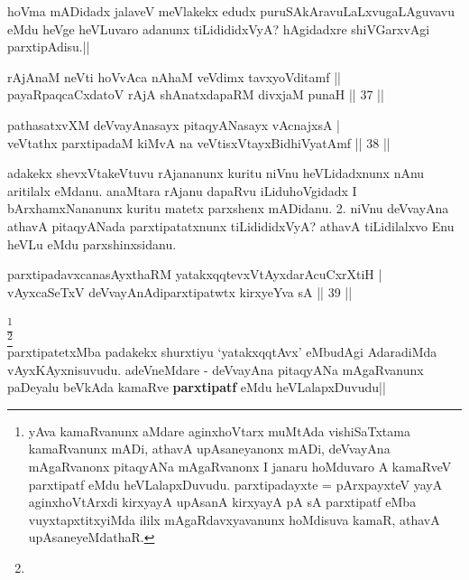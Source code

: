 \begin{artha}
hoVma mADidadx jalaveV meVlakekx edudx puruSAkAravuLaLxvugaLAguvavu 
eMdu heVge heVLuvaro adanunx tiLidididxVyA? hAgidadxre shiVGarxvAgi 
parxtipAdisu.||
\end{artha}

\begin{shl}
rAjAnaM neVti hoVvAca nAhaM veVdimx tavxyoVditamf || \\
payaRpaqcaCxdatoV rAjA shAnatxdapaRM divxjaM punaH \hfill|| 37 || 
\end{shl}

\begin{shl}
pathasatxvXM deVvayAnasayx pitaqyANasayx vA\s cnajxsA | \\
veVtathx parxtipadaM kiMvA na veVtisxVtayxBidhiVyatAmf \hfill|| 38 || 
\end{shl}

\begin{artha}
adakekx shevxVtakeVtuvu rAjananunx kuritu niVnu heVLidadxnunx nAnu 
aritilalx eMdanu. anaMtara rAjanu dapaRvu iLiduhoVgidadx I 
bArxhamxNananunx kuritu matetx parxshenx mADidanu. 2. niVnu deVvayAna 
athavA pitaqyANada parxtipatatxnunx tiLidididxVyA? athavA tiLidilalxvo 
Enu heVLu eMdu parxshinxsidanu.
\end{artha}


\begin{shl}
parxtipadavxcanasAyxthaRM  yatakxqqtevxVtAyxdarAcuCxrXtiH | \\
vAyxcaSeTxV deVvayAnAdiparxtipatwtx kirxyeYva sA \hfill|| 39 || 
\end{shl}

\begin{artha}
\footnote[1]{yAva kamaRvanunx aMdare aginxhoVtarx muMtAda 
vishiSaTxtama kamaRvanunx mADi, athavA upAsaneyanonx mADi, deVvayAna 
mAgaRvanonx pitaqyANa mAgaRvanonx I janaru hoMduvaro A kamaRveV 
parxtipatf eMdu heVLalapxDuvudu. parxtipadayxte = pArxpayxteV yayA 
aginxhoVtArxdi kirxyayA upAsanA kirxyayA pA sA parxtipatf eMba 
vuyxtapxtitxyiMda ililx mAgaRdavxyavanunx hoMdisuva kamaR, athavA 
upAsaneyeMdathaR.}\\
\footnote[2]{}\\
parxtipatetxMba padakekx shurxtiyu `yatakxqqtAvx' eMbudAgi AdaradiMda 
vAyxKAyxnisuvudu. adeVneMdare - deVvayAna pitaqyANa mAgaRvanunx 
paDeyalu beVkAda kamaRve \textbf{parxtipatf} eMdu heVLalapxDuvudu||
\end{artha}

